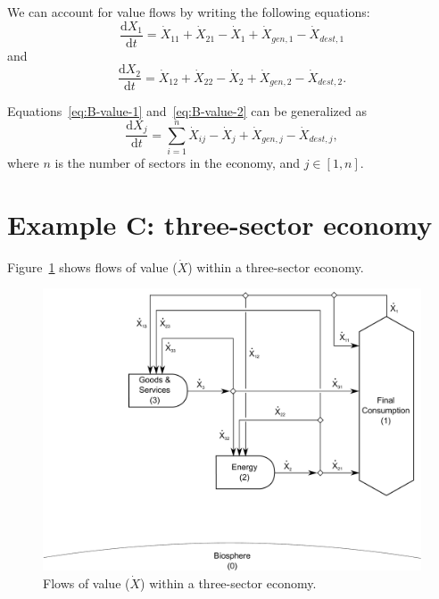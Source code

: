 We can account for value flows by writing
the following equations:
%
\begin{equation}\label{eq:B-value-1}
	\frac{\mathrm{d}X_{1}}{\mathrm{d}t}
	= \dot{X}_{11}
	+ \dot{X}_{21}
	- \dot{X}_{1}
	+ \dot{X}_{gen,1}
	- \dot{X}_{dest,1}
\end{equation}
%
and
%
\begin{equation}\label{eq:B-value-2}
	\frac{\mathrm{d}X_{2}}{\mathrm{d}t}
	= \dot{X}_{12}
	+ \dot{X}_{22}
	- \dot{X}_{2}
	+ \dot{X}_{gen,2}
	- \dot{X}_{dest,2}.
\end{equation}

Equations~\ref{eq:B-value-1} and~\ref{eq:B-value-2}
can be generalized as
%
\begin{equation}\label{eq:B-value-generalized}
	\frac{\mathrm{d}X_{j}}{\mathrm{d}t}
	= \sum\limits_{i=1}^n \dot{X}_{ij}
	- \dot{X}_{j}
	+ \dot{X}_{gen,j}
	- \dot{X}_{dest,j},
\end{equation}
%
where $n$ is the number of sectors in the economy, and $j \in [1, n]$.


\section{Example C: three-sector economy} %
\label{sec:value_example_C}

Figure~\ref{fig:C_value} shows flows of value ($\dot{X}$) 
within a three-sector economy. 

\begin{landscape}
\begin{figure}[!ht]
\centering
\includegraphics[width=0.8\linewidth]{Part_2/Chapter_Values/images/3_sector_value.pdf}
\caption[Flows of value within a three-sector economy]{Flows of value ($\dot{X}$) within a three-sector economy.}
\label{fig:C_value}
\end{figure}
\end{landscape}

